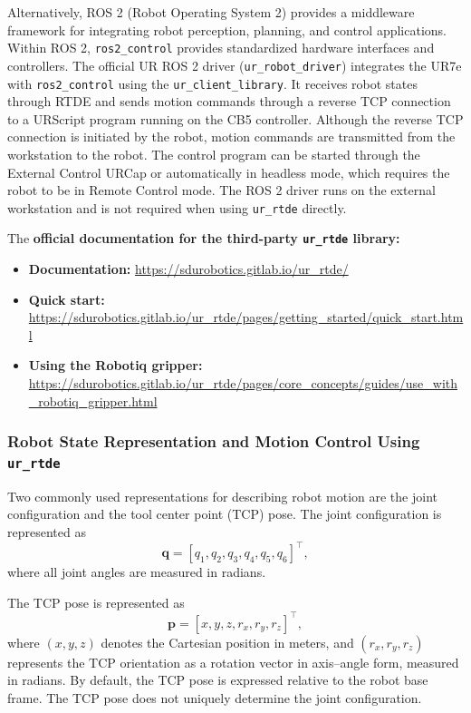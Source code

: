 \documentclass[11pt,a4paper]{article}
\begin{document}
Alternatively, ROS 2 (Robot Operating System 2) provides
a middleware framework for integrating robot perception,
planning, and control applications. Within ROS 2,
\texttt{ros2\_control} provides standardized hardware
interfaces and controllers. The official UR ROS 2 driver
(\texttt{ur\_robot\_driver}) integrates the UR7e with
\texttt{ros2\_control} using the
\texttt{ur\_client\_library}. It receives robot states
through RTDE and sends motion commands through a reverse
TCP connection to a URScript program running on the CB5
controller. Although the reverse TCP connection is
initiated by the robot, motion commands are transmitted
from the workstation to the robot. The control program
can be started through the External Control URCap or
automatically in headless mode, which requires the robot
to be in Remote Control mode. The ROS 2 driver runs on
the external workstation and is not required when using
\texttt{ur\_rtde} directly.

The \textbf{official documentation for the third-party \texttt{ur\_rtde} library:}
\begin{itemize}
    \item \textbf{Documentation:}
    \url{https://sdurobotics.gitlab.io/ur_rtde/}
    \item \textbf{Quick start:}
    \url{https://sdurobotics.gitlab.io/ur_rtde/pages/getting_started/quick_start.html}
    \item \textbf{Using the Robotiq gripper:}
    \url{https://sdurobotics.gitlab.io/ur_rtde/pages/core_concepts/guides/use_with_robotiq_gripper.html}
\end{itemize}




\subsubsection{Robot State Representation and Motion Control Using \texttt{ur\_rtde}}
\label{sec:ur7e_motion_control}

Two commonly used representations for describing robot motion are the joint configuration and the tool center point (TCP) pose. The joint configuration is represented as
\begin{equation}
    \mathbf{q} = [q_1,q_2,q_3,q_4,q_5,q_6]^\top,
\end{equation}
where all joint angles are measured in radians.

The TCP pose is represented as
\begin{equation}
    \mathbf{p} = [x,y,z,r_x,r_y,r_z]^\top,
\end{equation}
where $(x,y,z)$ denotes the Cartesian position in meters, and $(r_x,r_y,r_z)$ represents the TCP orientation as a rotation vector in axis--angle form, measured in radians. By default, the TCP pose is expressed relative to the robot base frame. The TCP pose does not uniquely determine the joint configuration.
\end{document}
